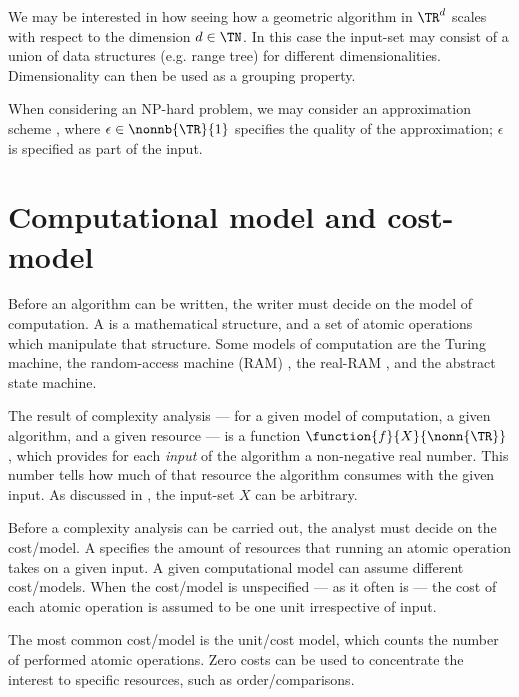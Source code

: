 \documentclass[b5paper, english, oneside]{memoir}
\begin{document}
\begin{example}
We may be interested in how seeing how a geometric algorithm in $\TR^d$ scales with respect to the dimension $d \in \TN$. In this case the input-set may consist of a union of data structures (e.g. range tree) for different dimensionalities. Dimensionality can then be used as a grouping property.
\end{example}

\begin{example}
When considering an NP-hard problem, we may consider an approximation scheme \cite{IntroAlgo2009}, where $\epsilon \in \nonnb{\TR}{1}$ specifies the quality of the approximation; $\epsilon$ is specified as part of the input.
\end{example}

\section{Computational model and cost-model}
\label{Cost models}

Before an algorithm can be written, the writer must decide on the model of computation. A  is a mathematical structure, and a set of atomic operations which manipulate that structure. Some models of computation are the Turing machine, the random-access machine (RAM) \cite{RamModel}, the real-RAM \cite{RealRam}, and the abstract state machine.

The result of complexity analysis --- for a given model of computation, a given algorithm, and a given resource --- is a function $\function{f}{X}{\nonn{\TR}}$, which provides for each \emph{input} of the algorithm a non-negative real number. This number tells how much of that resource the algorithm consumes with the given input. As discussed in , the input-set $X$ can be arbitrary.

Before a complexity analysis can be carried out, the analyst must decide on the cost\-/model. A  specifies the amount of resources that running an atomic operation takes on a given input. A given computational model can assume different cost\-/models. When the cost\-/model is unspecified --- as it often is --- the cost of each atomic operation is assumed to be one unit irrespective of input. 

\begin{example}
The most common cost\-/model is the unit\-/cost model, which counts the number of performed atomic operations. Zero costs can be used to concentrate the interest to specific resources, such as order\-/comparisons. 
\end{example}
\end{document}
